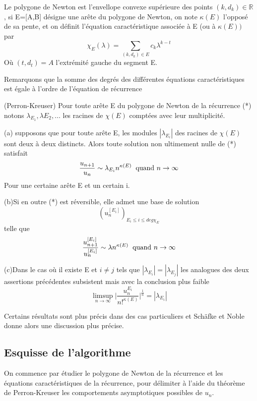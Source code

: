\documentclass[a4paper,10.5pt]{article}
\begin{document}
	
	\begin{definition} Le polygone de Newton est l'envellope convexe supérieure des points $(k, d_{k}) \in \mathbb{R}$, si E=[A,B] désigne une arête du polygone de Newton, on note $\kappa(E)$ l'opposé de sa pente, et on définit l'équation caractéristique associée à E (ou à $\kappa(E))$ par
		\[\chi_{E}(\lambda)=\sum_{(k,d_{k}) \in E} c_{k}\lambda^{k-t}\]
		Où $(t,d_{t})=A$ l'extrémité gauche du segment E.
	\end{definition}
	
	Remarquons que la somme des degrés des différentes équations caractéristiques est égale à l'ordre de l'équation de récurrence 
	
	\begin{theorem} (Perron-Kreuser)
		Pour toute arête E du polygone de Newton de la récurrence (*) notons $\lambda_{E_{1}},\lambda{E_{2}},...$ les racines de $\chi(E)$ comptées avec leur multiplicité.
		
		(a) supposons que pour toute arête E, les modules $|\lambda_{E_{i}}|$ des racines de $\chi(E)$ sont deux à deux distincts. Alors toute solution non ultimement nulle de (*) satisfait
		\[\frac{u_{n+1}}{u_{n}}\sim \lambda_{E_{i}}n^{\kappa(E)} \hspace{2mm} \text{quand } n \rightarrow \infty\]
		Pour une certaine arête E et un certain i.
		
		(b)Si en outre (*) est réversible, elle admet une base de solution 
		\[(u_{n}^{[E_{i}]})_{E_{i}\leq i \leq deg \chi_{E}}\]
		telle que 
		\[\frac{u_{n+1}^{[E_{i}]}}{u_{n}^{[E_{i}]}}\sim \lambda n^{\kappa(E)} \hspace{2mm} \text{quand } n \rightarrow \infty\]
		
		(c)Dans le cas où il existe E et $i \neq j$ tels que $|\lambda_{E_{i}}|=|\lambda_{E_{j}}|$ les analogues des deux assertions précédentes subsistent mais avec la conclusion plus faible
		\[\limsup_{n \rightarrow \infty } \big|\frac{u_{n}^{E_{i}}}{n!^{\kappa(E)}}\big|^{\frac{1}{n}}=|\lambda_{E_{i}}|\]
	\end{theorem}
	
	Certains résultats sont plus précis dans des cas particuliers et Schäfke et Noble donne alors une discussion plus précise.
	
	\subsection{Esquisse de l'algorithme}
	
	On commence par étudier le polygone de Newton de la récurrence et les équations caractéristiques de la récurrence, pour délimiter à l'aide du théorème de Perron-Kreuser les comportements asymptotiques possibles de $u_{n}$.
	
\end{document}
